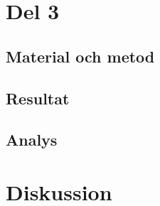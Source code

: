 \documentclass[11p]{article}
\begin{document}
    \section{Del 3}
    \subsection{Material och metod}
    \subsection{Resultat}
    \subsection{Analys}
    \section{Diskussion}
\end{document}
